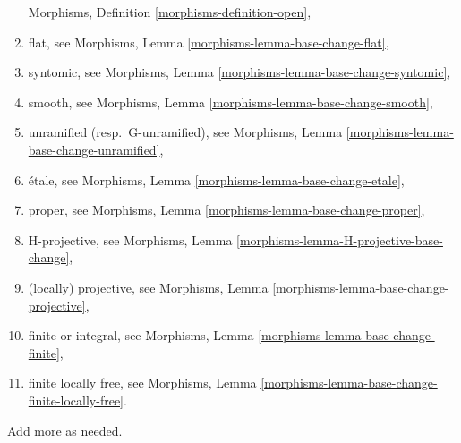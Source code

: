 \begin{remark}
\begin{enumerate}
Morphisms, Definition \ref{morphisms-definition-open},
\item flat, see
Morphisms, Lemma \ref{morphisms-lemma-base-change-flat},
\item syntomic, see
Morphisms, Lemma \ref{morphisms-lemma-base-change-syntomic},
\item smooth, see
Morphisms, Lemma \ref{morphisms-lemma-base-change-smooth},
\item unramified (resp.\ G-unramified), see
Morphisms, Lemma \ref{morphisms-lemma-base-change-unramified},
\item \'etale, see
Morphisms, Lemma \ref{morphisms-lemma-base-change-etale},
\item proper, see
Morphisms, Lemma \ref{morphisms-lemma-base-change-proper},
\item H-projective, see
Morphisms, Lemma \ref{morphisms-lemma-H-projective-base-change},
\item (locally) projective, see
Morphisms, Lemma \ref{morphisms-lemma-base-change-projective},
\item finite or integral, see
Morphisms, Lemma \ref{morphisms-lemma-base-change-finite},
\item finite locally free, see
Morphisms, Lemma \ref{morphisms-lemma-base-change-finite-locally-free}.
\end{enumerate}
Add more as needed.
\end{remark}

